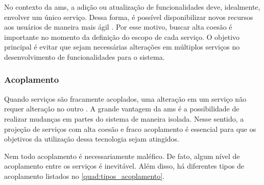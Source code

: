 No contexto da \acrshort{ams}, a adição ou atualização de funcionalidades deve, idealmente, envolver um único serviço. Dessa forma, é possível disponibilizar novos recursos aos usuários de maneira mais ágil \cite{buildingMicroservices}. Por esse motivo, buscar alta coesão é importante no momento da definição do escopo de cada serviço. O objetivo principal é evitar que sejam necessárias alterações em múltiplos serviços no desenvolvimento de funcionalidades para o sistema.

\subsubsection{Acoplamento}
Quando serviços são fracamente acoplados, uma alteração em um serviço não requer alteração no outro \cite{buildingMicroservices}. A grande vantagem da \acrshort{ams} é a possibilidade de realizar mudanças em partes do sistema de maneira isolada. Nesse sentido, a projeção de serviços com alta coesão e fraco acoplamento é essencial para que os objetivos da utilização dessa tecnologia sejam atingidos.

Nem todo acoplamento é necessariamente maléfico. De fato, algum nível de acoplamento entre os serviços é inevitável. Além disso, há diferentes tipos de acoplamento listados no \autoref{quad:tipos_acoplamento}.

